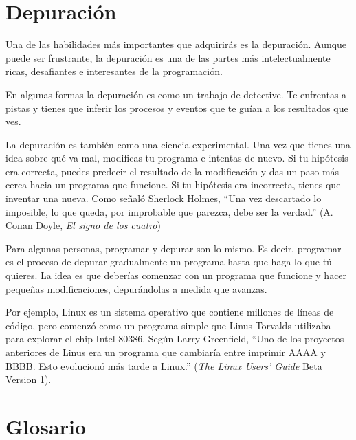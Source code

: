 \documentclass[10pt]{book}
\begin{document}
\section{Depuración}

Una de las habilidades más importantes que adquirirás es la depuración.
Aunque puede ser frustrante, la depuración es una de las partes más
intelectualmente ricas, desafiantes e interesantes de
la programación.

En algunas formas la depuración es como un trabajo de detective.  Te enfrentas
a pistas y tienes que inferir los procesos y eventos que te guían
a los resultados que ves.

La depuración es también como una ciencia experimental.  Una vez que tienes una idea
sobre qué va mal, modificas tu programa e intentas de nuevo.  Si
tu hipótesis era correcta, puedes predecir el resultado de la
modificación y das un paso más cerca hacia un programa que funcione.  Si
tu hipótesis era incorrecta, tienes que inventar una nueva.  Como
señaló Sherlock Holmes, ``Una vez descartado lo
imposible, lo que queda, por improbable que parezca, debe ser la verdad.''
(A. Conan Doyle, {\em El signo de los cuatro})

Para algunas personas, programar y depurar son lo mismo.  Es
decir, programar es el proceso de depurar gradualmente un programa hasta que
haga lo que tú quieres.  La idea es que deberías comenzar con un
programa que funcione y hacer pequeñas modificaciones,
depurándolas a medida que avanzas.

Por ejemplo, Linux es un sistema operativo que contiene millones de
líneas de código, pero comenzó como un programa simple que Linus Torvalds
utilizaba para explorar el chip Intel 80386.  Según Larry Greenfield,
``Uno de los proyectos anteriores de Linus era un programa que cambiaría
entre imprimir AAAA y BBBB.  Esto evolucionó más tarde a Linux.''
({\em The Linux Users' Guide} Beta Version 1).


\section{Glosario}
\end{document}
